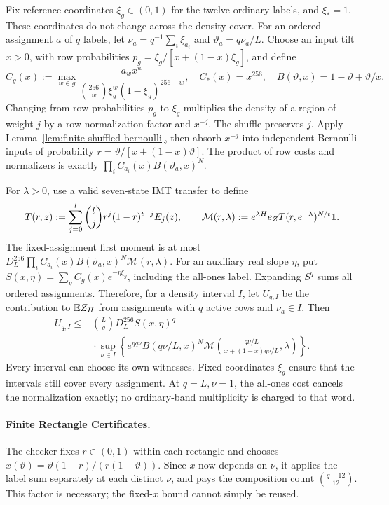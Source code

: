 Fix reference coordinates $\xi_g\in(0,1)$ for the twelve ordinary labels,
and $\xi_*=1$. These coordinates do not change across the density cover.
For an ordered assignment $a$ of $q$ labels, let
$\nu_a=q^{-1}\sum_i\xi_{a_i}$ and $\vartheta_a=q\nu_a/L$.
Choose an input tilt $x>0$, with row probabilities
$p_g=\xi_g/[x+(1-x)\xi_g]$, and define
\[
 C_g(x):=\max_{w\in g}
   \frac{a_wx^w}{\binom{256}{w}\xi_g^w(1-\xi_g)^{256-w}},
 \quad C_*(x)=x^{256},
 \quad B(\vartheta,x)=1-\vartheta+\vartheta/x.
\]
Changing from row probabilities $p_g$ to $\xi_g$ multiplies the density of a
region of weight $j$ by a row-normalization factor and $x^{-j}$.
The shuffle preserves $j$. Apply Lemma~\ref{lem:finite-shuffled-bernoulli}, then absorb $x^{-j}$ into
independent Bernoulli inputs of probability
$r=\vartheta/[x+(1-x)\vartheta]$. The product of row costs and normalizers
is exactly $\prod_i C_{a_i}(x)B(\vartheta_a,x)^N$.

For $\lambda>0$, use a valid seven-state IMT transfer to define
\[
 T(r,z):=\sum_{j=0}^t\binom tj r^j(1-r)^{t-j}E_j(z),\qquad
 \mathcal M(r,\lambda):=e^{\lambda H}e_ZT(r,e^{-\lambda})^{N/t}\mathbf 1.
\]
The fixed-assignment first moment is at most
$D_L^{256}\prod_iC_{a_i}(x)B(\vartheta_a,x)^N\mathcal M(r,\lambda)$.
For an auxiliary real slope $\eta$, put
$S(x,\eta)=\sum_g C_g(x)e^{-\eta\xi_g}$, including the all-ones label.
Expanding $S^q$ sums all ordered assignments. Therefore, for a density
interval $I$, let $U_{q,I}$ be the contribution to $\mathbb E Z_H$ from
assignments with $q$ active rows and $\nu_a\in I$. Then
\begin{equation}
 \begin{split}
 U_{q,I}\le{}&\binom Lq D_L^{256} S(x,\eta)^q\\
 &{}\cdot\sup_{\nu\in I}
 \left\{e^{\eta q\nu}B(q\nu/L,x)^N
 \mathcal M\!\left(\frac{q\nu/L}{x+(1-x)q\nu/L},\lambda\right)\right\}.
 \end{split}
 \label{eq:finite-dense-tilt}
\end{equation}
Every interval can choose its own witnesses. Fixed coordinates $\xi_g$
ensure that the intervals still cover every assignment.
At $q=L,\nu=1$, the all-ones cost cancels the normalization exactly;
no ordinary-band multiplicity is charged to that word.

\paragraph{Finite Rectangle Certificates.}
The checker fixes $r\in(0,1)$ within each rectangle and chooses
$x(\vartheta)=\vartheta(1-r)/(r(1-\vartheta))$.
Since $x$ now depends on $\nu$, it applies the label sum separately at each
distinct $\nu$, and pays the composition count $\binom{q+12}{12}$.
This factor is necessary; the fixed-$x$ bound cannot simply be reused.

